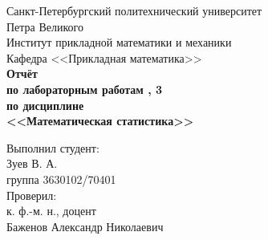 \documentclass[main.tex]{subfiles}
\begin{document}
\begin{titlepage}
\begin{center}
	\begin{large}
		Санкт-Петербургский политехнический университет\\
		Петра Великого \\ 
		\vspace{\baselineskip}
		Институт прикладной математики и механики\\
		Кафедра <<Прикладная математика>>\\
	\vfill
	\textbf{Отчёт\\
		по лабораторным работам , 3\\
		по дисциплине\\
		<<Математическая статистика>>}
	\end{large}
\end{center}
\vfill
\flushleft
{\addtolength{\leftskip}{\linewidth / 2}
	Выполнил студент:\\
	Зуев В. А.\\
	группа 3630102/70401\\
	Проверил:\\
	к. ф.-м. н., доцент\\
	Баженов Александр Николаевич\\
}
\vfill
{}
\end{titlepage}
\end{document}
